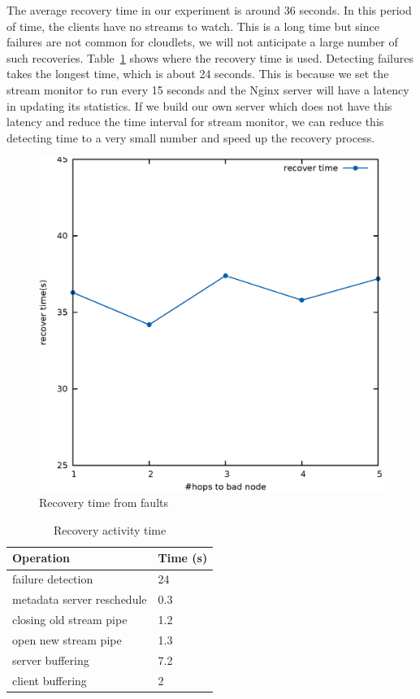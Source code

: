\documentclass[letterpaper,twocolumn,10pt]{article}
\begin{document}
The average recovery time in our experiment is around 36 seconds. In this period of time, the clients have no streams to watch. This is a long time but since failures are not common for cloudlets, we will not anticipate a large number of such recoveries. Table~\ref{tab:recovery} shows where the recovery time is used. Detecting failures takes the longest time, which is about 24 seconds. This is because we set the stream monitor to run every 15 seconds and the Nginx server will have a latency in updating its statistics. If we build our own server which does not have this latency and reduce the time interval for stream monitor, we can reduce this detecting time to a very small number and speed up the recovery process.

\begin{figure}[h]
\begin{center}
\includegraphics[scale=0.3]{pic/faultToleranceTime.eps}
\end{center}
\caption{Recovery time from faults}
\label{fig:faultTolerance}
\end{figure}

\begin{table}[h]
\begin{center}
\begin{tabular}{|l|l|}
\hline
Operation & Time (s) \\ \hline
failure detection & 24 \\ \hline
metadata server reschedule & 0.3 \\ \hline
closing old stream pipe & 1.2 \\ \hline
open new stream pipe & 1.3 \\ \hline
server buffering & 7.2 \\ \hline
client buffering & 2 \\ \hline
\end{tabular}
\caption{Recovery activity time}
\end{center}
\label{tab:recovery}
\end{table}
\end{document}
